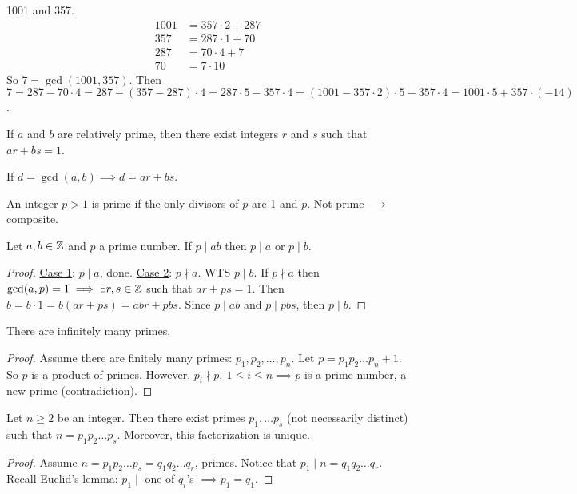 \documentclass[]{article}
\begin{document}
\begin{example}
	1001 and 357.
	\begin{align*}
		1001 &= 357\cdot 2 + 287\\
		357 &= 287\cdot 1 + 70\\
		287 &= 70\cdot 4 + 7\\
		70 &= 7\cdot 10 
	\end{align*}
	So $7 = \gcd(1001,357)$. Then $7 = 287 - 70\cdot 4 = 287 - (357 - 287)\cdot 4 = 287 \cdot 5 - 357 \cdot 4 = (1001-357\cdot 2)\cdot 5 - 357\cdot 4 = 1001 \cdot 5 + 357 \cdot (-14)$.
\end{example}
\begin{corollary}
	If $a$ and $b$ are relatively prime, then there exist integers $r$ and $s$ such that $ar+bs = 1$.
\end{corollary}
If $d = \gcd(a,b)\implies d = ar+bs$.

An integer $p>1$ is \ul{prime} if the only divisors of $p$ are 1 and $p$. Not prime $\longrightarrow$ composite.

\begin{lemma}
	[Euclid] Let $a,b\in\mathbb{Z}$ and $p$ a prime number. If $p\mid ab$ then $p\mid a$ or $p\mid b$.
\end{lemma}
\begin{proof}
	\ul{Case 1}: $p\mid a$, done.
	\ul{Case 2}: $p\nmid a$. WTS $p\mid b$. If $p\nmid a$ then $\gcd(a,p) = 1 \implies \exists r,s\in\mathbb{Z}$ such that $ar+ps = 1$. Then $b = b\cdot 1 = b (ar+ps) = abr + pbs$. Since $p\mid ab$ and $p\mid pbs$, then $p\mid b$.
\end{proof}
\begin{theorem}
	[Euclid] There are infinitely many primes.
\end{theorem}
\begin{proof}
	Assume there are finitely many primes: $p_1,p_2,\dots,p_n$. Let $p = p_1p_2\dots p_n + 1$. So $p$ is a product of primes. However, $p_i\nmid p,\ 1\leq i\leq n \implies p$ is a prime number, a new prime (contradiction).
\end{proof}
\begin{theorem}
	 Let $n\geq 2$ be an integer. Then there exist primes $p_1,\dots p_s$ (not necessarily distinct) such that $n = p_1p_2\dots p_s$.
	Moreover, this factorization is unique.
\end{theorem}
\begin{proof}
	Assume $n = p_1 p_2\dots p_s = q_1 q_2\dots q_r$, primes. Notice that $p_1\mid n = q_1 q_2\dots q_r$. Recall Euclid's lemma: $p_1 \mid$ one of $q_i$'s $\implies p_1 = q_1$.
\end{proof}
\end{document}
